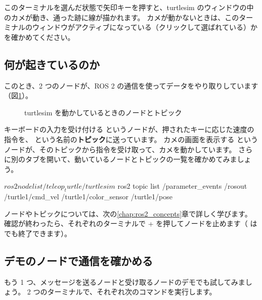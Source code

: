 このターミナルを選んだ状態で矢印キーを押すと、turtlesim のウィンドウの中のカメが動き、通った跡に線が描かれます。
カメが動かないときは、このターミナルのウィンドウがアクティブになっている（クリックして選ばれている）かを確かめてください。

\subsection{何が起きているのか}

このとき、2 つのノードが、ROS 2 の通信を使ってデータをやり取りしています（図\ref{fig:ros2-install-graph}）。

\begin{figure}[tb]
  \centering
  
  \caption{turtlesim を動かしているときのノードとトピック}
  \label{fig:ros2-install-graph}
\end{figure}

キーボードの入力を受け付ける  というノードが、押されたキーに応じた速度の指令を、 という名前の\textbf{トピック}に送っています。
カメの画面を表示する  というノードが、そのトピックから指令を受け取って、カメを動かしています。
さらに別のタブを開いて、動いているノードとトピックの一覧を確かめてみましょう。

\begin{terminal}[ノードとトピックの一覧を確認する]
$ ros2 node list
/teleop_turtle
/turtlesim
$ ros2 topic list
/parameter_events
/rosout
/turtle1/cmd_vel
/turtle1/color_sensor
/turtle1/pose
\end{terminal}

ノードやトピックについては、次の\ref{chap:ros2_concepts}章で詳しく学びます。
確認が終わったら、それぞれのターミナルで + を押してノードを止めます（ は  でも終了できます）。

\subsection{デモのノードで通信を確かめる}

もう 1 つ、メッセージを送るノードと受け取るノードのデモでも試してみましょう。
2 つのターミナルで、それぞれ次のコマンドを実行します。


